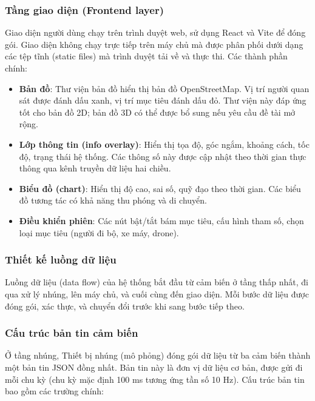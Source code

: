 \subsubsection{Tầng giao diện (Frontend layer)}

\hspace{0.5cm} Giao diện người dùng chạy trên trình duyệt web, sử dụng React và Vite để đóng gói. Giao diện không chạy trực tiếp trên máy chủ mà được phân phối dưới dạng các tệp tĩnh (static files) mà trình duyệt tải về và thực thi. Các thành phần chính:

\begin{itemize}
    \item \textbf{Bản đồ}: Thư viện bản đồ hiển thị bản đồ OpenStreetMap. Vị trí người quan sát được đánh dấu xanh, vị trí mục tiêu đánh dấu đỏ. Thư viện này đáp ứng tốt cho bản đồ 2D; bản đồ 3D có thể được bổ sung nếu yêu cầu đề tài mở rộng.
    \item \textbf{Lớp thông tin (info overlay)}: Hiển thị tọa độ, góc ngắm, khoảng cách, tốc độ, trạng thái hệ thống. Các thông số này được cập nhật theo thời gian thực thông qua kênh truyền dữ liệu hai chiều.
    \item \textbf{Biểu đồ (chart)}: Hiển thị độ cao, sai số, quỹ đạo theo thời gian. Các biểu đồ tương tác có khả năng thu phóng và di chuyển.
    \item \textbf{Điều khiển phiên}: Các nút bật/tắt bám mục tiêu, cấu hình tham số, chọn loại mục tiêu (người đi bộ, xe máy, drone).
\end{itemize}

\subsubsection{Thiết kế luồng dữ liệu}

\hspace{0.5cm} Luồng dữ liệu (data flow) của hệ thống bắt đầu từ cảm biến ở tầng thấp nhất, đi qua xử lý nhúng, lên máy chủ, và cuối cùng đến giao diện. Mỗi bước dữ liệu được đóng gói, xác thực, và chuyển đổi trước khi sang bước tiếp theo.

\subsubsection{Cấu trúc bản tin cảm biến}

\hspace{0.5cm} Ở tầng nhúng, Thiết bị nhúng (mô phỏng) đóng gói dữ liệu từ ba cảm biến thành một bản tin JSON đồng nhất. Bản tin này là đơn vị dữ liệu cơ bản, được gửi đi mỗi chu kỳ (chu kỳ mặc định 100 ms tương ứng tần số 10 Hz). Cấu trúc bản tin bao gồm các trường chính:


